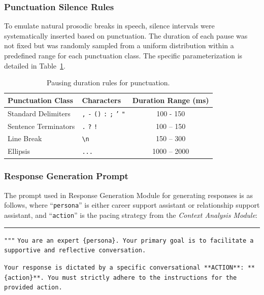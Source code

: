 \subsubsection{Punctuation Silence Rules}

To emulate natural prosodic breaks in speech, silence intervals were systematically inserted based on punctuation. The duration of each pause was not fixed but was randomly sampled from a uniform distribution within a predefined range for each punctuation class. The specific parameterization is detailed in Table~\ref{tab:punctuation_rules}.

\begin{table}[h!]
\centering
\caption{Pausing duration rules for punctuation.}
\label{tab:punctuation_rules}
\begin{tabular}{l l c}
\toprule
\textbf{Punctuation Class} & \textbf{Characters} & \textbf{Duration Range (ms)} \\
\midrule
Standard Delimiters & \texttt{,} \texttt{-} \texttt{()} \texttt{:} \texttt{;} \texttt{'} \texttt{"} & 100 - 150\\
Sentence Terminators & \texttt{.} \texttt{?} \texttt{!} & 100 -- 150\\
Line Break & \texttt{\textbackslash n} & 150 -- 300\\
Ellipsis & \texttt{...} & 1000 -- 2000\\
\bottomrule
\end{tabular}
\end{table}

\subsubsection{Response Generation Prompt}
\label{appx:experimental_prompt}
The prompt used in Response Generation Module for generating responses is as follows, where ``\texttt{persona}'' is either career support assistant or relationship support assistant, and ``\texttt{action}'' is the pacing strategy from the \emph{Context Analysis Module}:

\noindent\rule{\linewidth}{0.2pt}

\texttt{"""}
\texttt{You are an expert \textcolor{ccolor}{\{persona\}}. Your primary goal is to facilitate a supportive and reflective conversation.}

\texttt{Your response is dictated by a specific conversational **ACTION**: **\textcolor{ccolor}{\{action\}}**. You must strictly adhere to the instructions for the provided action.}

